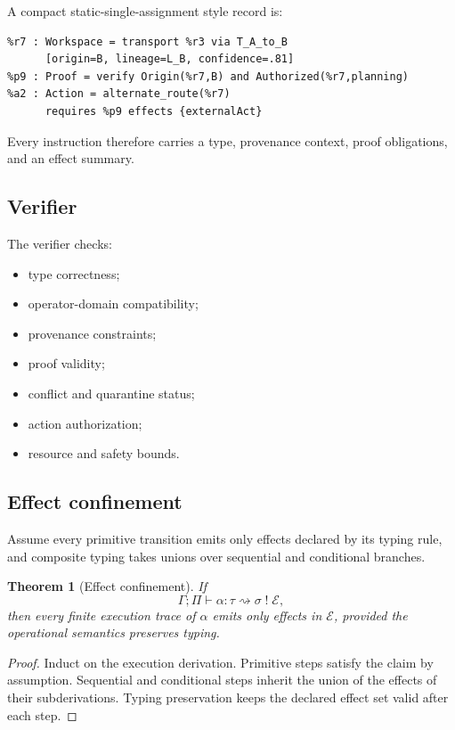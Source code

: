 \documentclass[11pt]{article}
\newtheorem{theorem}{Theorem}[section]
\theoremstyle{definition}
\theoremstyle{remark}
\begin{document}
A compact static-single-assignment style record is:
\begin{syntaxbox}
\begin{verbatim}
%r7 : Workspace = transport %r3 via T_A_to_B
      [origin=B, lineage=L_B, confidence=.81]
%p9 : Proof = verify Origin(%r7,B) and Authorized(%r7,planning)
%a2 : Action = alternate_route(%r7)
      requires %p9 effects {externalAct}
\end{verbatim}
\end{syntaxbox}
Every instruction therefore carries a type, provenance context, proof obligations, and an effect summary.

\subsection{Verifier}

The verifier checks:
\begin{itemize}[leftmargin=1.6em]
  \item type correctness;
  \item operator-domain compatibility;
  \item provenance constraints;
  \item proof validity;
  \item conflict and quarantine status;
  \item action authorization;
  \item resource and safety bounds.
\end{itemize}

\subsection{Effect confinement}

Assume every primitive transition emits only effects declared by its typing rule, and composite typing takes unions over sequential and conditional branches.

\begin{theorem}[Effect confinement]
If
\[
\Gamma;\Pi\vdash
\alpha:\tau\rightsquigarrow\sigma\;!\;\mathcal E,
\]
then every finite execution trace of \(\alpha\) emits only effects in \(\mathcal E\), provided the operational semantics preserves typing.
\end{theorem}

\begin{proof}
Induct on the execution derivation. Primitive steps satisfy the claim by assumption. Sequential and conditional steps inherit the union of the effects of their subderivations. Typing preservation keeps the declared effect set valid after each step.
\end{proof}
\end{document}
